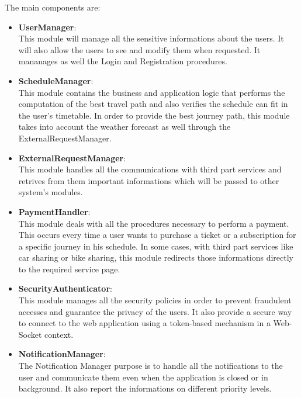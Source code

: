 \documentclass[numbers=noenddot, 12pt, a4paper, oneside]{scrbook}
\begin{document}
The main components are:
\begin{itemize}
	\item \textbf{UserManager}:\\\newline
	This module will manage all the sensitive informations about the users. It will also allow the users to see and modify them when requested. It mananages as well the Login and Registration procedures.\\
	
	\item \textbf{ScheduleManager}:\\\newline
	This module contains the business and application logic that performs the computation of the best travel path and also verifies the schedule can fit in the user's timetable. In order to provide the best journey path, this module takes into account the weather forecast as well through the ExternalRequestManager.\\
	
	\item \textbf{ExternalRequestManager}:\\\newline
	This module handles all the communications with third part services and retrives from them important informations which will be passed to other system's modules. \\
	
	\item \textbf{PaymentHandler}:\\\newline
	This module deals with all the procedures necessary to perform a payment. This occurs every time a user wants to purchase a ticket or a subscription for a specific journey in his schedule. In some cases, with third part services like car sharing or bike sharing, this module redirects those informations directly to the required service page.\\
	
	\item \textbf{SecurityAuthenticator}:\\\newline
	This module manages all the security policies in order to prevent fraudulent accesses and guarantee the privacy of the users. It also provide a secure way to connect to the web application using a token-based mechanism in a Web-Socket context. \\
	
	\item \textbf{NotificationManager}:\\\newline
	The Notification Manager purpose is to handle all the notifications to the user and communicate them even when the application is closed or in background. It also report the informations on different priority levels.\\
	

\end{itemize}
\end{document}
